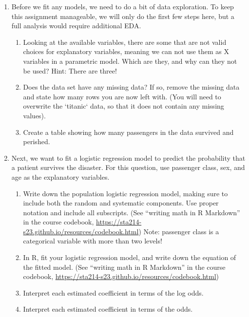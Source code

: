 \documentclass[11pt]{article}
\begin{document}
\begin{enumerate}
\item Before we fit any models, we need to do a bit of data exploration. To keep this assignment manageable, we will only do the first few steps here, but a full analysis would require additional EDA.

\begin{enumerate}
\item Looking at the available variables, there are some that are not valid choices for explanatory variables, meaning we can not use them as X variables in a parametric model. Which are they, and why can they not be used? Hint: There are three!

\item Does the data set have any missing data? If so, remove the missing data and state how many rows you are now left with. (You will need to overwrite the `titanic` data, so that it does not contain any missing values).

\item Create a table showing how many passengers in the data survived and perished.
\end{enumerate}

\item Next, we want to fit a logistic regression model to predict the probability that a patient survives the disaster. For this question, use passenger class, sex, and age as the explanatory variables.

\begin{enumerate}
\item Write down the population logistic regression model, making sure to include both the random and systematic components. Use proper notation and include all subscripts. (See ``writing math in R Markdown'' in the course codebook, \url{https://sta214-s23.github.io/resources/codebook.html}) Note: passenger class is a categorical variable with more than two levels! 

\item In R, fit your logistic regression model, and write down the equation of the fitted model. (See ``writing math in R Markdown'' in the course codebook, \url{https://sta214-s23.github.io/resources/codebook.html})

\item Interpret each estimated coefficient in terms of the log odds.

\item Interpret each estimated coefficient in terms of the odds.
\end{enumerate}


\end{enumerate}
\end{document}
